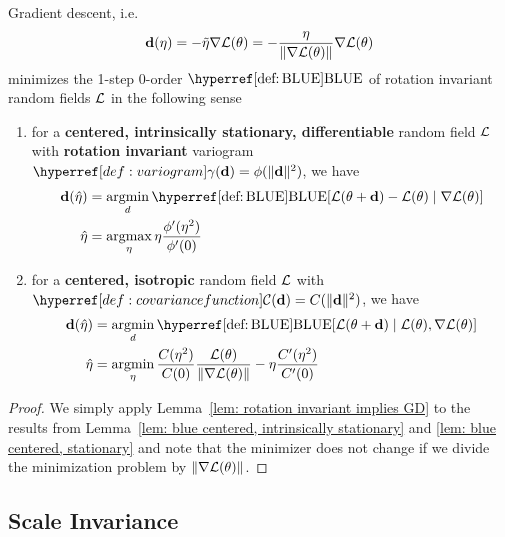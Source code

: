 \begin{theorem}\label{thm: bayesian descent}
	Gradient descent, i.e. 
	\begin{equation*}
		\mathbf{d}(\eta) = - \tilde{\eta} \nabla\mathcal{L}(\theta)
		= - \frac{\eta}{\|\nabla\mathcal{L}(\theta)\|} \nabla\mathcal{L}(\theta)
	\end{equation*}
	minimizes the 1-step 0-order \(\BLUE\) of rotation invariant random fields
	\(\mathcal{L}\) in the following sense
	\begin{enumerate}
		\item for a \textbf{centered, intrinsically stationary, differentiable}
		random field \(\mathcal{L}\) with \textbf{rotation invariant} variogram
		\(\variogram(\step) = \phi(\|\step\|^2)\), we have
		\begin{align*}
			\step(\hat{\lr})
			&= \argmin_{d}
			\BLUE[\Loss(\param + \step) - \Loss(\param)\mid \grad\Loss(\param)]\\
			\hat{\lr}
			&= \argmax_{\lr} \lr\frac{\phi'(\lr^2)}{\phi'(0)}
		\end{align*}


		\item for a \textbf{centered, isotropic} random field \(\mathcal{L}\) with
		\(\C(\step)=C(\|\step\|^2)\), we have
		\begin{align*}
			\step(\hat{\lr})
			&= \argmin_{d}
			\BLUE[\Loss(\param + \step)\mid \Loss(\param), \grad\Loss(\param)]\\
			\hat{\lr}
			&= \argmin_{\lr}\frac{\sqC(\lr^2)}{\sqC(0)} \frac{\Loss(\param)}{\|\grad\Loss(\param)\|}
		-  \lr\frac{\sqC'(\lr^2)}{\sqC'(0)}
		\end{align*}
	\end{enumerate}
\end{theorem}

\begin{proof}
	We simply apply Lemma~\ref{lem: rotation invariant implies GD}	to the results
	from Lemma~\ref{lem: blue centered, intrinsically stationary} and \ref{lem:
	blue centered, stationary} and note that the minimizer does not change if
	we divide the minimization problem by \(\|\nabla\mathcal{L}(\theta)\|\).
\end{proof}

\subsection{Scale Invariance}

